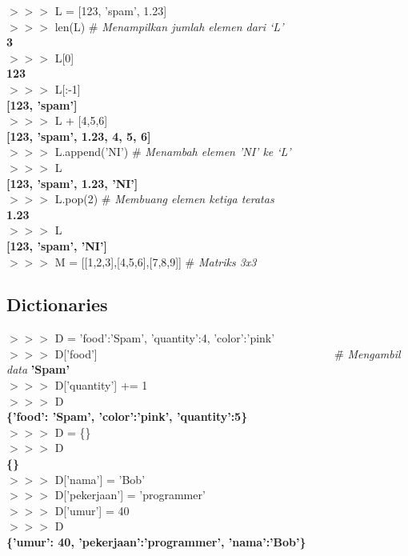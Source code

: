 \begin{IDLE}
\begin{tabbing}
$>>>$ L = [123, 'spam', 1.23] ~~~~~~~~~~~~~~~~~~~~~ \= \\
$>>>$ len(L) \> \# \textit{Menampilkan jumlah elemen dari `L'}\\
\textbf{3}\\
$>>>$ L[0]\\
\textbf{123}\\
$>>>$ L[:-1]\\
\textbf{[123, 'spam']}\\
$>>>$ L + [4,5,6]\\
\textbf{[123, 'spam', 1.23, 4, 5, 6]}\\
$>>>$ L.append('NI') \> \# \textit{Menambah elemen 'NI' ke `L'}\\
$>>>$ L \\
\textbf{[123, 'spam', 1.23, 'NI']} \\
$>>>$ L.pop(2) \> \# \textit{Membuang elemen ketiga teratas}\\
\textbf{1.23} \\
$>>>$ L \\ 
\textbf{[123, 'spam', 'NI']} \\
$>>>$ M = [[1,2,3],[4,5,6],[7,8,9]] \> \# \textit{Matriks 3x3}
\end{tabbing}
\end{IDLE}

\subsection{Dictionaries}

\begin{IDLE}
\begin{tabbing}
$>>>$ D = {'food':'Spam', 'quantity':4, 'color':'pink'} \\
$>>>$ D['food'] ~~~~~~~~~~~~~~~~~~~~~~~~~~~~~~~~~~~~~~~~~ \=  \# \textit{Mengambil data}
\textbf{'Spam'} \\
$>>>$ D['quantity'] += 1 \\
$>>>$ D \\ 
\textbf{\{'food': 'Spam', 'color':'pink', 'quantity':5\}} \\
$>>>$ D = \{\} \\
$>>>$ D \\
\textbf{\{\}}\\
$>>>$ D['nama'] = 'Bob' \\
$>>>$ D['pekerjaan'] = 'programmer' \\
$>>>$ D['umur'] = 40 \\
$>>>$ D \\
\textbf{\{'umur': 40, 'pekerjaan':'programmer', 'nama':'Bob'\}}
\end{tabbing}
\end{IDLE}

